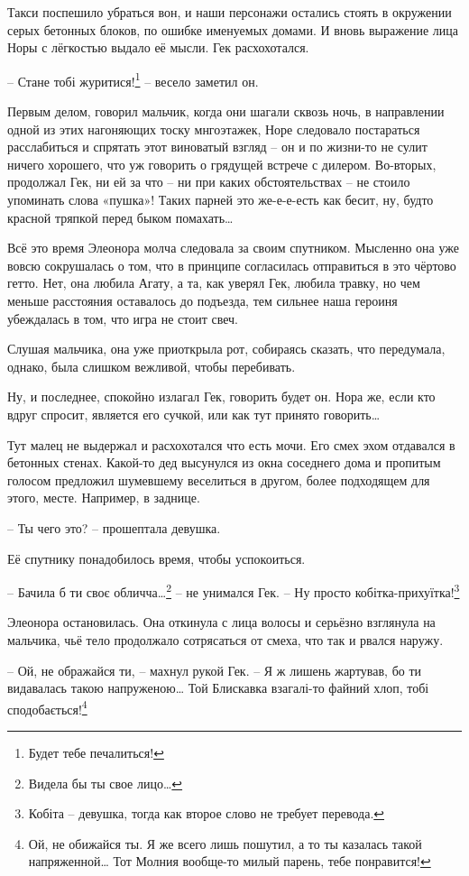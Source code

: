 \documentclass[
  a5paperpaper,
  DIV=11,
  numbers=noendperiod]{scrreprt}
\begin{document}
Такси поспешило убраться вон, и наши персонажи остались стоять в
окружении серых бетонных блоков, по ошибке именуемых домами. И вновь
выражение лица Норы с лёгкостью выдало её мысли. Гек расхохотался.

-- Стане тобі журитися!\footnote{Будет тебе печалиться!} -- весело
заметил он.

Первым делом, говорил мальчик, когда они шагали сквозь ночь, в
направлении одной из этих нагоняющих тоску мнгоэтажек, Норе следовало
постараться расслабиться и спрятать этот виноватый взгляд -- он и по
жизни-то не сулит ничего хорошего, что уж говорить о грядущей встрече с
дилером. Во-вторых, продолжал Гек, ни ей за что -- ни при каких
обстоятельствах -- не стоило упоминать слова «пушка»! Таких парней это
же-е-е-есть как бесит, ну, будто красной тряпкой перед быком
помахать\ldots{}

Всё это время Элеонора молча следовала за своим спутником. Мысленно она
уже вовсю сокрушалась о том, что в принципе согласилась отправиться в
это чёртово гетто. Нет, она любила Агату, а та, как уверял Гек, любила
травку, но чем меньше расстояния оставалось до подъезда, тем сильнее
наша героиня убеждалась в том, что игра не стоит свеч.

Слушая мальчика, она уже приоткрыла рот, собираясь сказать, что
передумала, однако, была слишком вежливой, чтобы перебивать.

Ну, и последнее, спокойно излагал Гек, говорить будет он. Нора же, если
кто вдруг спросит, является его сучкой, или как тут принято
говорить\ldots{}

Тут малец не выдержал и расхохотался что есть мочи. Его смех эхом
отдавался в бетонных стенах. Какой-то дед высунулся из окна соседнего
дома и пропитым голосом предложил шумевшему веселиться в другом, более
подходящем для этого, месте. Например, в заднице.

-- Ты чего это? -- прошептала девушка.

Её спутнику понадобилось время, чтобы успокоиться.

-- Бачила б ти своє обличча\ldots{}\footnote{Видела бы ты свое
  лицо\ldots{}} -- не унимался Гек. -- Ну просто
кобітка-прихуїтка!\footnote{Кобіта -- девушка, тогда как второе слово не
  требует перевода.}

Элеонора остановилась. Она откинула с лица волосы и серьёзно взглянула
на мальчика, чьё тело продолжало сотрясаться от смеха, что так и рвался
наружу.

-- Ой, не ображайся ти, -- махнул рукой Гек. -- Я ж лишень жартував, бо
ти видавалась такою напруженою\ldots{} Той Блискавка взагалі-то файний
хлоп, тобі сподобається!\footnote{Ой, не обижайся ты. Я же всего лишь
  пошутил, а то ты казалась такой напряженной\ldots{} Тот Молния
  вообще-то милый парень, тебе понравится!}
\end{document}

